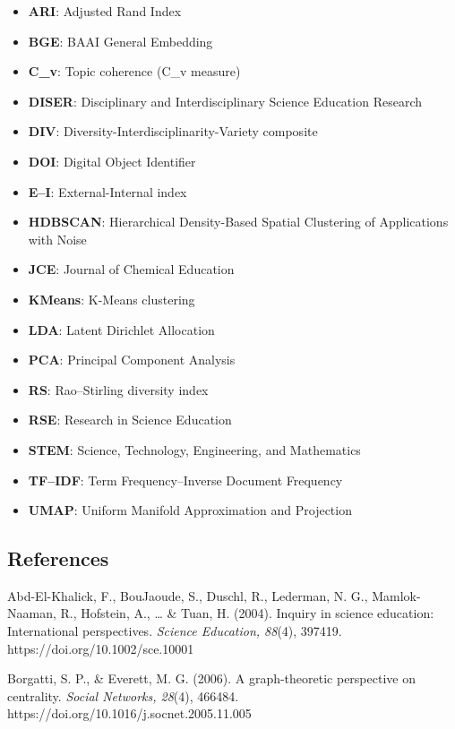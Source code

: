 \documentclass[pdflatex,sn-apa]{sn-jnl}
\providecommand{\tightlist}{\setlength{\itemsep}{0pt}\setlength{\parskip}{0pt}}
\begin{document}
\begin{itemize}
\tightlist
\item
  \textbf{ARI}: Adjusted Rand Index
\item
  \textbf{BGE}: BAAI General Embedding
\item
  \textbf{C\_v}: Topic coherence (C\_v measure)
\item
  \textbf{DISER}: Disciplinary and Interdisciplinary Science Education
  Research
\item
  \textbf{DIV}: Diversity-Interdisciplinarity-Variety composite
\item
  \textbf{DOI}: Digital Object Identifier
\item
  \textbf{E--I}: External-Internal index
\item
  \textbf{HDBSCAN}: Hierarchical Density-Based Spatial Clustering of
  Applications with Noise
\item
  \textbf{JCE}: Journal of Chemical Education
\item
  \textbf{KMeans}: K-Means clustering
\item
  \textbf{LDA}: Latent Dirichlet Allocation
\item
  \textbf{PCA}: Principal Component Analysis
\item
  \textbf{RS}: Rao--Stirling diversity index
\item
  \textbf{RSE}: Research in Science Education
\item
  \textbf{STEM}: Science, Technology, Engineering, and Mathematics
\item
  \textbf{TF--IDF}: Term Frequency--Inverse Document Frequency
\item
  \textbf{UMAP}: Uniform Manifold Approximation and Projection
\end{itemize}

\subsection{References}\label{references}

Abd-El-Khalick, F., BouJaoude, S., Duschl, R., Lederman, N. G.,
Mamlok-Naaman, R., Hofstein, A., \ldots{} \& Tuan, H. (2004). Inquiry in
science education: International perspectives. \emph{Science Education,
88}(4), 397419. https://doi.org/10.1002/sce.10001

Borgatti, S. P., \& Everett, M. G. (2006). A graph-theoretic perspective
on centrality. \emph{Social Networks, 28}(4), 466484.
https://doi.org/10.1016/j.socnet.2005.11.005
\end{document}
